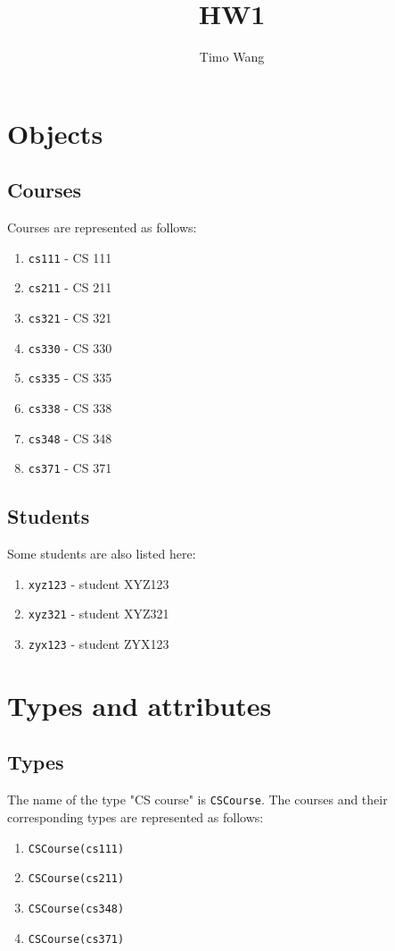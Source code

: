\documentclass[11pt]{article}
\title{HW1}
\author{Timo Wang}
\begin{document}
\maketitle

\section{Objects}

\subsection{Courses}
Courses are represented as follows:
\begin{enumerate}
  \item \texttt{cs111} - CS 111
  \item \texttt{cs211} - CS 211
  \item \texttt{cs321} - CS 321
  \item \texttt{cs330} - CS 330
  \item \texttt{cs335} - CS 335
  \item \texttt{cs338} - CS 338
  \item \texttt{cs348} - CS 348
  \item \texttt{cs371} - CS 371
\end{enumerate}

\subsection{Students}
Some students are also listed here:
\begin{enumerate}
  \item \texttt{xyz123} - student XYZ123
  \item \texttt{xyz321} - student XYZ321
  \item \texttt{zyx123} - student ZYX123
\end{enumerate}


\section{Types and attributes}

\subsection{Types}
The name of the type "CS course" is \texttt{CSCourse}.
The courses and their corresponding types are represented as follows:
\begin{enumerate}
  \item \texttt{CSCourse(cs111)}
  \item \texttt{CSCourse(cs211)}
  \item \texttt{CSCourse(cs348)}
  \item \texttt{CSCourse(cs371)}
\end{enumerate}
\end{document}

